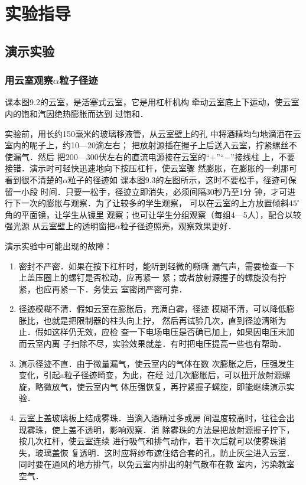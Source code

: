 \section{实验指导}
\subsection{演示实验}
\subsubsection{用云室观察$\alpha$粒子径迹}

课本图9.2的云室，是活塞式云室，它是用杠杆机构
牵动云室底上下运动，使云室内的饱和汽因绝热膨胀而达到
过饱和．

实验前，用长约150毫米的玻璃移液管，从云室壁上的孔
中将酒精均匀地滴洒在云室内的呢子上，约10—20滴左右；
把放射源插在握子上后送入云室，拧紧螺丝不使漏气．然后
把200—300伏左右的直流电源接在云室的“$+$”“$-$”接线柱
上，不要接错．演示时可轻快迅速地向下按压杠杆，使云室骤
然膨胀，在膨胀的一刹那可看到很不清楚的$\alpha$粒子的径迹如
课本图9.3的左图所示，这时不要松手，径迹可保留一小段
时间．只要一松手，径迹立即消失，必须间隔30秒乃至1分
钟，才可进行下一次的膨胀与观察．为了让较多的学生观察，
可以在云室的上方放置倾斜$45^{\circ}$角的平面镜，让学生从镜里
观察；也可让学生分组观察（每组4—5人），配合以较强光源
从云室壁上的透明窗把$\alpha$粒子径迹照亮，观察效果更好．

演示实验中可能出现的故障：
\begin{enumerate}
    \item 密封不严密．如果在按下杠杆时，能听到轻微的嘶嘶
漏气声，需要检查一下上盖压圈上的螺钉是否松动，应再紧一
紧；或者放射源握子的螺旋没有拧紧，也应再紧一下．务使云
室密闭严密可靠．
\item 径迹模糊不清．假如云室在膨胀后，充满白雾，径迹
模糊不清，可以降低膨胀比，也就是把限制器的柱头向上拧，
然后再试验几次，直到径迹清晰为止．假如这样仍无效，应检
查一下电场电压是否确已加上，如果因电压未加而云室内离
子扫除不尽，实验效果就差．有时把电压提高一些也有帮助．
\item 演示径迹不直．由于微量漏气，使云室内的气体在数
次膨胀之后，压强发生变化，引起a粒子径迹畸变，为此，在经
过几次膨胀后，可以扭开放射源螺旋，略微放气，使云室内气
体压强恢复，再拧紧握子螺旋，即能继续演示实验．
\item 云室上盖玻璃板上结成雾珠．当滴入酒精过多或房
间温度较高时，往往会出现雾珠，使上盖不透明，影响观察．消
除雾珠的方法是把放射源握子拧下，按几次杠杆，使云室连续
进行吸气和排气动作，若干次后就可以使雾珠消失，玻璃盖恢
复透明．这时应将纱布遮住结合套的孔，防止灰尘进入云室．
同时要在通风的地方排气，以免云室内排出的射气散布在教
室内，污染教室空气．
\end{enumerate}

